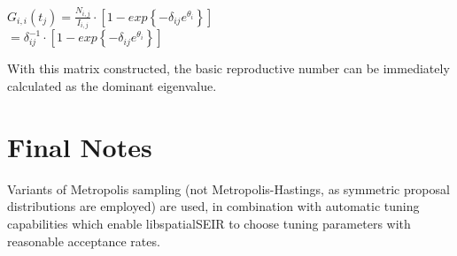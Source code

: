 \documentclass[12pt]{article}
\newcommand \mbreak {\\ \vspace{0.1in}}
\begin{document}
\begin{center}
    $G_{i,i}(t_j) = \frac{N_{i,j}}{I_{i,j}}\cdot \left[1-exp\left\{-\delta_{ij}e^{\theta_{i}} \right\}\right]$ \mbreak
    $ = \delta_{ij}^{-1}\cdot \left[1-exp\left\{-\delta_{ij}e^{\theta_{i}} \right\}\right]$ \mbreak
\end{center}

With this matrix constructed, the basic reproductive number can be immediately calculated as the dominant eigenvalue. 


\section{Final Notes}

Variants of Metropolis sampling (not Metropolis-Hastings, as symmetric proposal distributions are employed) are used, in combination 
with automatic tuning capabilities which enable libspatialSEIR to choose tuning parameters with reasonable acceptance rates. 
\end{document}
